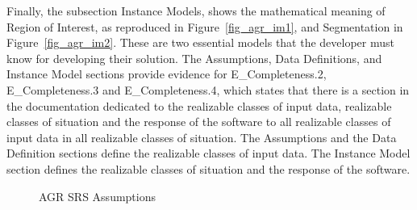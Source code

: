 \begin{itemize}
\hspace{\enumerateparindent}Finally, the subsection Instance Models, shows the mathematical meaning of Region of Interest, as reproduced in Figure~\ref{fig_agr_im1}, and Segmentation in Figure~\ref{fig_agr_im2}. These are two essential models that the developer must know for developing their solution. The Assumptions, Data Definitions, and Instance Model sections provide evidence for E\_Completeness.2, E\_Completeness.3 and E\_Completeness.4, which states that there is a section in the documentation dedicated to the realizable classes of input data, realizable classes of situation and the response of the software to all realizable classes of input data in all realizable classes of situation. The Assumptions and the Data Definition sections define the realizable classes of input data. The Instance Model section defines the realizable classes of situation and the response of the software.

\begin{figure}[H]
    \centering
    \caption[AGR SRS Assumptions]{AGR SRS Assumptions}
    \label{fig_agr_srs_a}
\end{figure}


\end{itemize}
